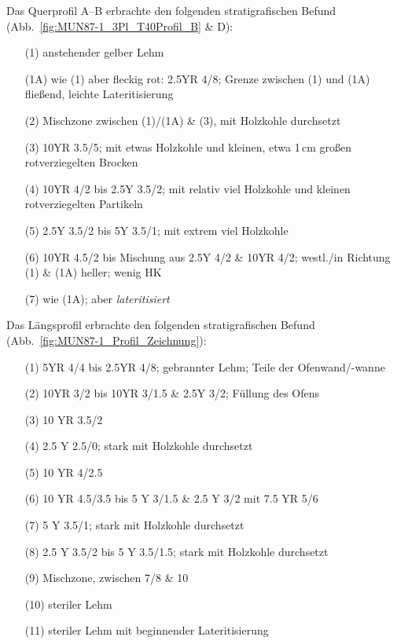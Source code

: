 \vspace{1em}
\noindent Das Querprofil A--B erbrachte den folgenden stratigrafischen Befund (Abb.~\ref{fig:MUN87-1_3Pl_T40Profil_B} \& D):
\begin{itemize}[leftmargin=*, labelindent=1.25em, noitemsep, topsep=0pt]
	\item[(1)] anstehender gelber Lehm
	\item[(1A)] wie (1) aber fleckig rot: 2.5YR 4/8; Grenze zwischen (1) und (1A) fließend, leichte Lateritisierung
	\item[(2)] Mischzone zwischen (1)/(1A) \& (3), mit  Holzkohle durchsetzt
	\item[(3)] 10YR 3.5/5; mit etwas Holzkohle und kleinen, etwa 1\,cm großen rotverziegelten Brocken
	\item[(4)] 10YR 4/2 bis 2.5Y 3.5/2; mit relativ viel Holzkohle und kleinen rotverziegelten Partikeln
	\item[(5)] 2.5Y 3.5/2 bis 5Y 3.5/1; mit extrem viel Holzkohle
	\item[(6)] 10YR 4.5/2 bis Mischung aus 2.5Y 4/2 \& 10YR 4/2; westl./in Richtung (1) \& (1A) heller; wenig HK
	\item[(7)] wie (1A); aber \textit{lateritisiert}
\end{itemize}

\vspace{1em}
\noindent Das Längsprofil erbrachte den folgenden stratigrafischen Befund (Abb.~\ref{fig:MUN87-1_Profil_Zeichnung}):
\begin{itemize}[leftmargin=*, labelindent=1.25em, noitemsep, topsep=0pt]
	\item[(1)] 5YR 4/4 bis 2.5YR 4/8; gebrannter Lehm; Teile der Ofenwand/-wanne
	\item[(2)] 10YR 3/2 bis 10YR 3/1.5 \& 2.5Y 3/2; Füllung des Ofens
	\item[(3)] 10 YR 3.5/2
	\item[(4)] 2.5 Y 2.5/0; stark mit Holzkohle durchsetzt
	\item[(5)] 10 YR 4/2.5
	\item[(6)] 10 YR 4.5/3.5 bis 5 Y 3/1.5 \& 2.5 Y 3/2 mit 7.5 YR 5/6
	\item[(7)] 5 Y 3.5/1; stark mit Holzkohle durchsetzt
	\item[(8)] 2.5 Y 3.5/2 bis 5 Y 3.5/1.5; stark mit Holzkohle durchsetzt
	\item[(9)] Mischzone, zwischen 7/8 \& 10
	\item[(10)] steriler Lehm
	\item[(11)] steriler Lehm mit beginnender Lateritisierung
\end{itemize}

